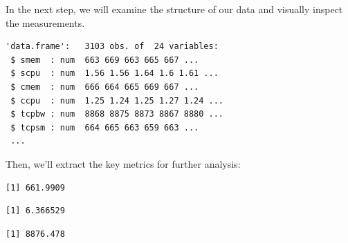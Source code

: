 In the next step, we will examine the structure of our data and visually
inspect the measurements.

\begin{Shaded}
\begin{Highlighting}[]
\end{Highlighting}
\end{Shaded}

\begin{verbatim}
'data.frame':   3103 obs. of  24 variables:
 $ smem  : num  663 669 663 665 667 ...
 $ scpu  : num  1.56 1.56 1.64 1.6 1.61 ...
 $ cmem  : num  666 664 665 669 667 ...
 $ ccpu  : num  1.25 1.24 1.25 1.27 1.24 ...
 $ tcpbw : num  8868 8875 8873 8867 8880 ...
 $ tcpsm : num  664 665 663 659 663 ...
 ...
\end{verbatim}

Then, we'll extract the key metrics for further analysis:

\begin{Shaded}
\begin{Highlighting}[]
\SpecialCharTok{\$}
\end{Highlighting}
\end{Shaded}

\begin{verbatim}
[1] 661.9909
\end{verbatim}

\begin{Shaded}
\begin{Highlighting}[]
\SpecialCharTok{\$}
\end{Highlighting}
\end{Shaded}

\begin{verbatim}
[1] 6.366529
\end{verbatim}

\begin{Shaded}
\begin{Highlighting}[]
\SpecialCharTok{\$}
\end{Highlighting}
\end{Shaded}

\begin{verbatim}
[1] 8876.478
\end{verbatim}

\begin{Shaded}
\begin{Highlighting}[]
\SpecialCharTok{\$}
\end{Highlighting}
\end{Shaded}

